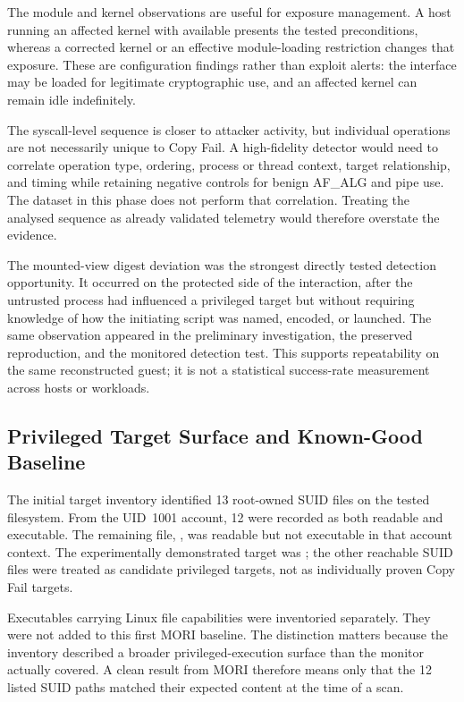 The module and kernel observations are useful for exposure management. A host
running an affected kernel with  available presents the
tested preconditions, whereas a corrected kernel or an effective module-loading
restriction changes that exposure. These are configuration findings rather
than exploit alerts: the interface may be loaded for legitimate cryptographic
use, and an affected kernel can remain idle indefinitely.

The syscall-level sequence is closer to attacker activity, but individual
operations are not necessarily unique to Copy Fail. A high-fidelity detector
would need to correlate operation type, ordering, process or thread context,
target relationship, and timing while retaining negative controls for benign
AF\_ALG and pipe use. The dataset in this phase does not perform that
correlation. Treating the analysed sequence as already validated telemetry
would therefore overstate the evidence.

The mounted-view digest deviation was the strongest directly tested detection
opportunity. It occurred on the protected side of the interaction, after the
untrusted process had influenced a privileged target but without requiring
knowledge of how the initiating script was named, encoded, or launched. The
same observation appeared in the preliminary investigation, the preserved
reproduction, and the monitored detection test. This supports repeatability on
the same reconstructed guest; it is not a statistical success-rate measurement
across hosts or workloads.

\subsection{Privileged Target Surface and Known-Good Baseline}

The initial target inventory identified 13 root-owned SUID files on the tested
filesystem. From the UID~1001  account, 12 were recorded as both
readable and executable. The remaining file,
, was readable but not
executable in that account context. The experimentally demonstrated target was
; the other reachable SUID files were treated as candidate
privileged targets, not as individually proven Copy Fail targets.

Executables carrying Linux file capabilities were inventoried separately. They
were not added to this first MORI baseline. The distinction matters because the
inventory described a broader privileged-execution surface than the monitor
actually covered. A clean result from MORI therefore means only that the 12
listed SUID paths matched their expected content at the time of a scan.

